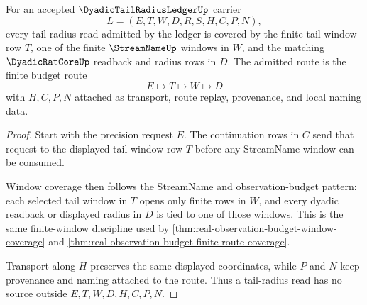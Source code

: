\begin{theorem}
\label{thm:dyadic-tail-radius-ledger-tail-budget-coverage}
For an accepted $\DyadicTailRadiusLedgerUp$ carrier
$$
L=(E,T,W,D,R,S,H,C,P,N),
$$
every tail-radius read admitted by the ledger is covered by the finite tail-window row $T$, one of the finite $\StreamNameUp$ windows in $W$, and the matching $\DyadicRatCoreUp$ readback and radius rows in $D$. The admitted route is the finite budget route
$$
E \longmapsto T \longmapsto W \longmapsto D
$$
with $H,C,P,N$ attached as transport, route replay, provenance, and local naming data.
\end{theorem}
\begin{proof}
Start with the precision request $E$. The continuation rows in $C$ send that request to the displayed tail-window row $T$ before any StreamName window can be consumed.

Window coverage then follows the StreamName and observation-budget pattern: each selected tail window in $T$ opens only finite rows in $W$, and every dyadic readback or displayed radius in $D$ is tied to one of those windows. This is the same finite-window discipline used by \autoref{thm:real-observation-budget-window-coverage} and \autoref{thm:real-observation-budget-finite-route-coverage}.

Transport along $H$ preserves the same displayed coordinates, while $P$ and $N$ keep provenance and naming attached to the route. Thus a tail-radius read has no source outside $E,T,W,D,H,C,P,N$.
\end{proof}

